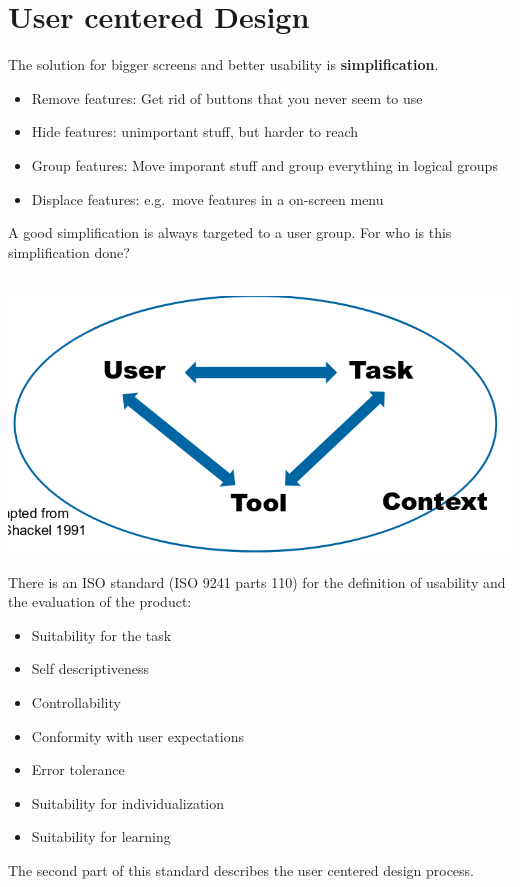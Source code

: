 \section{User centered Design}

\begin{breakbox}

The solution for bigger screens and better usability is \textbf{simplification}.

\begin{itemize}
    \item Remove features: Get rid of buttons that you never seem to use 
    \item Hide features: unimportant stuff, but harder to reach
    \item Group features: Move imporant stuff and group everything in logical groups
    \item Displace features: e.g.~move features in a on-screen menu
\end{itemize}

A good simplification is always targeted to a user group. For who is this simplification done? 
\end{breakbox}

\begin{breakbox}
 \\
\includegraphics[width=.2\textwidth]{figures/simplification_context.png}
\end{breakbox}

\begin{breakbox}

There is an ISO standard (ISO 9241 parts 110) for the definition of
usability and the evaluation of the product:

\begin{itemize}
\tightlist
\item
  Suitability for the task
\item
  Self descriptiveness
\item
  Controllability
\item
  Conformity with user expectations
\item
  Error tolerance
\item
  Suitability for individualization
\item
  Suitability for learning
\end{itemize}

The second part of this standard describes the user centered design
process.
\end{breakbox}

